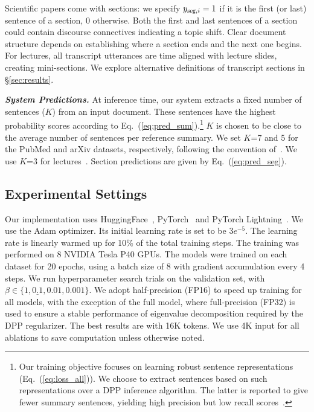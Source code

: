 \documentclass[11pt]{article}
\begin{document}
Scientific papers come with sections:
we specify $y_{\textsl{seg},i}=1$ if it is the first (or last) sentence of a section, 0 otherwise.
Both the first and last sentences of a section could contain discourse connectives indicating a topic shift.
Clear document structure depends on establishing where a section ends and the next one begins.
For lectures, all transcript utterances are time aligned with lecture slides, 
creating mini-sections. 
We explore alternative definitions of transcript sections in \S\ref{sec:results}.


\vspace{0.04in}
\noindent\textbf{\textsl{System Predictions.}}\quad
At inference time, our system extracts a fixed number of sentences ($K$) from an input document.
These sentences have the highest probability scores according to Eq.~(\ref{eq:pred_sum}).\footnote{
Our training objective focuses on learning robust sentence representations (Eq.~(\ref{eq:loss_all})).
We choose to extract sentences based on such representations over a DPP inference algorithm. 
The latter is reported to give fewer summary sentences, yielding high precision but low recall scores~\cite{Zhang:2016:DPP}.
}
$K$ is chosen to be close to the average number of sentences per reference summary.
We set $K$=7 and 5 for the PubMed and arXiv datasets, respectively, following the convention of~\citet{xiao-carenini-2019-extractive}.
We use $K$=3 for lectures~\cite{lv2021vt}.
Section predictions are given by Eq.~(\ref{eq:pred_seg}).


\subsection{Experimental Settings}
\label{sec:settings}

Our implementation uses HuggingFace~\cite{wolf-etal-2020-transformers}, PyTorch~\cite{PyTorch:NEURIPS2019_9015} and PyTorch Lightning~\cite{falcon2019pytorch}.
We use the Adam optimizer. Its initial learning rate is set to be $3e^{-5}$. The learning rate is linearly warmed up for 10\% of the total training steps.
The training was performed on 8 NVIDIA Tesla P40 GPUs.
The models were trained on each dataset for 20 epochs,
using a batch size of 8 with gradient accumulation every 4 steps.
We run hyperparameter search trials on the validation set, with $\beta \in \{1, \underline{0.1}, 0.01, 0.001\}$.
We adopt half-precision (FP16) to speed up training for all models,
with the exception of the full model, 
where full-precision (FP32) is used to ensure a stable performance of eigenvalue decomposition required by the DPP regularizer. 
The best results are with 16K tokens.
We use 4K input for all ablations to save computation unless otherwise noted.
\end{document}
